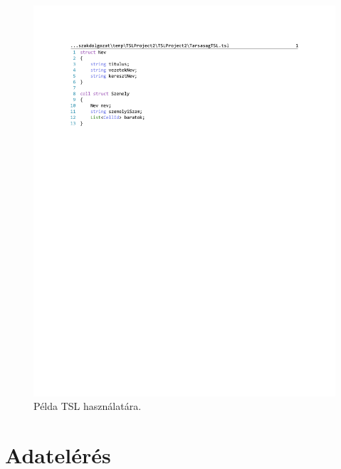 \begin{figure}[ht!]
	\centering
	\includegraphics[]{figures/TarsasagTSL.pdf}
	\caption{Példa TSL használatára.}
	\label{fig:TSL}
\end{figure}

\section{Adatelérés}

